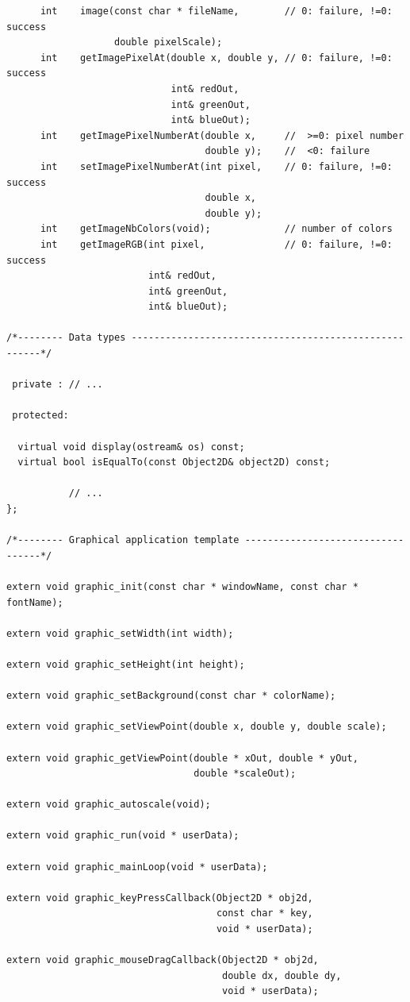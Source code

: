 \documentclass[12pt]{article}
\begin{document}
\begin{small}
\begin{verbatim}
      int    image(const char * fileName,        // 0: failure, !=0: success
                   double pixelScale);
      int    getImagePixelAt(double x, double y, // 0: failure, !=0: success
                             int& redOut,
                             int& greenOut,
                             int& blueOut);
      int    getImagePixelNumberAt(double x,     //  >=0: pixel number 
                                   double y);    //  <0: failure 
      int    setImagePixelNumberAt(int pixel,    // 0: failure, !=0: success
                                   double x,
                                   double y);
      int    getImageNbColors(void);             // number of colors
      int    getImageRGB(int pixel,              // 0: failure, !=0: success
                         int& redOut,
                         int& greenOut,
                         int& blueOut);

/*-------- Data types ------------------------------------------------------*/

 private : // ...

 protected:

  virtual void display(ostream& os) const;
  virtual bool isEqualTo(const Object2D& object2D) const;

           // ...
};

/*-------- Graphical application template ----------------------------------*/

extern void graphic_init(const char * windowName, const char * fontName);

extern void graphic_setWidth(int width);

extern void graphic_setHeight(int height);

extern void graphic_setBackground(const char * colorName);

extern void graphic_setViewPoint(double x, double y, double scale);

extern void graphic_getViewPoint(double * xOut, double * yOut,
                                 double *scaleOut);

extern void graphic_autoscale(void);

extern void graphic_run(void * userData);

extern void graphic_mainLoop(void * userData);

extern void graphic_keyPressCallback(Object2D * obj2d,
                                     const char * key,
                                     void * userData);

extern void graphic_mouseDragCallback(Object2D * obj2d,
                                      double dx, double dy,
                                      void * userData);


\end{verbatim}
\end{small}
\end{document}
